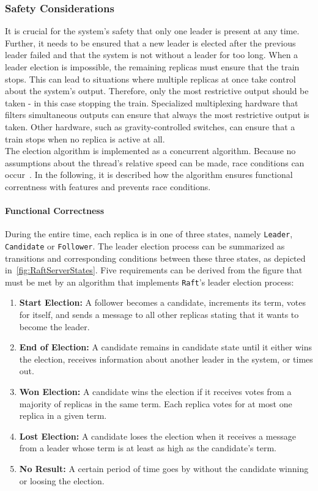 \subsubsection{Safety Considerations}
\label{subsub:raceConditions}

It is crucial for the system's safety that only one leader is present at any time.
Further, it needs to be ensured that a new leader is elected after the previous leader failed and that the system is not without a leader for too long.
When a leader election is impossible, the remaining replicas must ensure that the train stops.
This can lead to situations where multiple replicas at once take control about the system's output.
Therefore, only the most restrictive output should be taken - in this case stopping the train.
Specialized multiplexing hardware that filters simultaneous outputs can ensure that always the most restrictive output is taken.
Other hardware, such as gravity-controlled switches, can ensure that a train stops when no replica is active at all.
\\

The election algorithm is implemented as a concurrent algorithm.
Because no assumptions about the thread's relative speed can be made, race conditions can occur~\cite{Dijkstra1965}.
In the following, it is described how the algorithm ensures functional correntness with  features and prevents race conditions.

\paragraph{Functional Correctness}
During the entire time, each replica is in one of three states, namely \texttt{Leader}, \texttt{Candidate} or \texttt{Follower}.
The leader election process can be summarized as transitions and corresponding conditions between these three states, as depicted in~\autoref{fig:RaftServerStates}.
Five requirements can be derived from the figure that must be met by an algorithm that implements \texttt{Raft}'s leader election process:

\begin{enumerate}
\item \textbf{Start Election:} A follower becomes a candidate, increments its term, votes for itself, and sends a message to all other replicas stating that it wants to become the leader.
\item \textbf{End of Election:} A candidate remains in candidate state until it either wins the election, receives information about another leader in the system, or times out.
\item \textbf{Won Election:} A candidate wins the election if it receives votes from a majority of replicas in the same term. Each replica votes for at most one replica in a given term.
\item \textbf{Lost Election:} A candidate loses the election when it receives a message from a leader whose term is at least as high as the candidate's term.
\item \textbf{No Result:} A certain period of time goes by without the candidate winning or loosing the election.
\end{enumerate}

